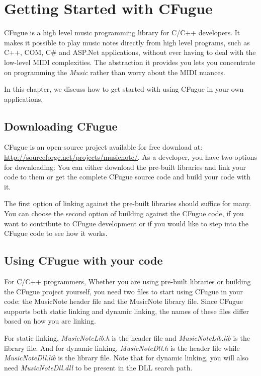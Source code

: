 \chapter{Getting Started with CFugue}

CFugue is a high level music programming library for C/C++ developers. It makes it possible to play music notes directly from high level programs, such as C++, COM, C\# and ASP.Net applications, without ever having to deal with the low-level MIDI complexities. The abstraction it provides you lets you concentrate on programming the \emph{Music} rather than worry about the MIDI nuances.

In this chapter, we discuss how to get started with using CFugue in your own applications.

\section{Downloading CFugue}
CFugue is an open-source project available for free download at: \url{http://sourceforge.net/projects/musicnote/}. As a developer, you have two options for downloading: You can either download the pre-built libraries and link your code to them or get the complete CFugue source code and build your code with it.

The first option of linking against the pre-built libraries should suffice for many. You can choose the second option of building against the CFugue code, if you want to contribute to CFugue development or if you would like to step into the CFugue code to see how it works.

\section{Using CFugue with your code}
For C/C++ programmers, Whether you are using pre-built libraries or building the CFugue project yourself, you need two files to start using CFugue in your code: the MusicNote header file and the MusicNote library file. Since CFugue supports both static linking and dynamic linking, the names of these files differ based on how you are linking.

For static linking, \emph{MusicNoteLib.h} is the header file and \emph{MusicNoteLib.lib} is the library file. And for dynamic linking, \emph{MusicNoteDll.h} is the header file while \emph{MusicNoteDll.lib} is the library file. Note that for dynamic linking, you will also need \emph{MusicNoteDll.dll} to be present in the DLL search path.

